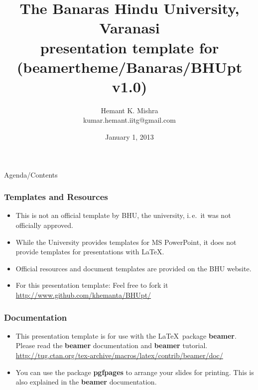 \documentclass[]{beamer} %
\author[]{Hemant K. Mishra \\ \tiny{kumar.hemant.iitg@gmail.com}}%
\title[]{The Banaras Hindu University, Varanasi \\ presentation template for \LaTeXe \\ (beamertheme/Banaras/BHUpt v1.0)}
\date{January 1, 2013} %
\begin{document}
\frame{\maketitle}
\begin{frame}{Agenda/Contents}%
\tableofcontents
\end{frame}



\begin{frame}
\frametitle{Templates and Resources}
	\begin{itemize}
	\item This is not an official template by BHU, the university,	i.\,e.\ it was not officially approved.
	\item While the University provides templates for MS PowerPoint, it does not provide templates for presentations with \LaTeX.
	\item Official resources and document templates are provided on the BHU website.
    \item For this presentation template: Feel free to fork it\\ 	
    {\small \url{http://www.github.com/khemanta/BHUpt/}} \\
	\end{itemize}
\end{frame}

\begin{frame}
\frametitle{Documentation}
	\begin{itemize}
	\item This presentation template is for use
	with the \LaTeX\ package \textbf{beamer}.
	Please read the \textbf{beamer} documentation
	and  \textbf{beamer} tutorial.\\	
    {\tiny \url{http://tug.ctan.org/tex-archive/macros/latex/contrib/beamer/doc/}}
	\item You can use the package \textbf{pgfpages}
	to arrange your slides for printing. This is also explained
	in the \textbf{beamer} documentation.
	\end{itemize}
\end{frame}
\end{document}
